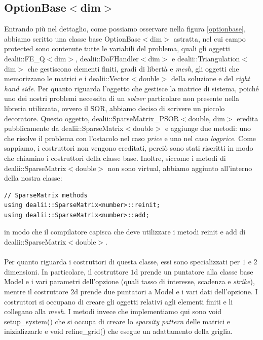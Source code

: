 \documentclass[a4paper,10pt]{report}
\theoremstyle{plain}
\theoremstyle{definition}
\theoremstyle{remark}
\begin{document}
\subsection{\textsf{OptionBase$<$dim$>$}}
Entrando pi\`u nel dettaglio, come possiamo osservare nella figura \ref{optionbase}, abbiamo scritto una classe base \textsf{OptionBase$<$dim$>$} astratta, nel cui campo \textsf{protected} sono contenute tutte le variabili del problema, quali gli oggetti \textsf{dealii::FE\_Q$<$dim$>$}, \textsf{dealii::DoFHandler$<$dim$>$} e \textsf{dealii::Triangulation$<$dim$>$} che gestiscono elementi finiti, gradi di libert\`a e \emph{mesh}, gli oggetti che memorizzano le matrici e i \textsf{dealii::Vector$<$double$>$} della soluzione e del \emph{right hand side}. Per quanto riguarda l'oggetto che gestisce la matrice di sistema, poich\'e uno dei nostri problemi necessita di un \emph{solver} particolare non presente nella libreria utilizzata, ovvero il SOR, abbiamo deciso di scrivere un piccolo decoratore. Questo oggetto, \textsf{dealii::SparseMatrix\_PSOR$<$double, dim$>$} eredita pubblicamente da \textsf{dealii::SparseMatrix$<$double$>$} e aggiunge due metodi: uno che risolve il problema con l'ostacolo nel caso \emph{price} e uno nel caso \emph{logprice}. Come sappiamo, i costruttori non vengono ereditati, perci\`o sono stati riscritti in modo che chiamino i costruttori della classe base. Inoltre, siccome i metodi di \textsf{dealii::SparseMatrix$<$double$>$} non sono \textsf{virtual}, abbiamo aggiunto all'interno della nostra classe:
\begin{lstlisting}
// SparseMatrix methods
using dealii::SparseMatrix<number>::reinit;
using dealii::SparseMatrix<number>::add;
\end{lstlisting}
in modo che il compilatore capisca che deve utilizzare i metodi \textsf{reinit} e \textsf{add} di \textsf{dealii::SparseMatrix$<$double$>$}.\\\\Per quanto riguarda i costruttori di questa classe, essi sono specializzati per $1$ e $2$ dimensioni. In particolare, il costruttore $1$d prende un puntatore alla classe base \textsf{Model} e i vari parametri dell'opzione (quali tasso di interesse, scadenza e \emph{strike}), mentre il costruttore $2$d prende due puntatori a \textsf{Model} e i vari dati dell'opzione. I costruttori si occupano di creare gli oggetti relativi agli elementi finiti e li collegano alla \emph{mesh}. I metodi invece che implementiamo qui sono \textsf{void setup\_system()} che si occupa di creare lo \emph{sparsity pattern} delle matrici e inizializzarle e \textsf{void refine\_grid()} che esegue un adattamento della griglia.
\end{document}
